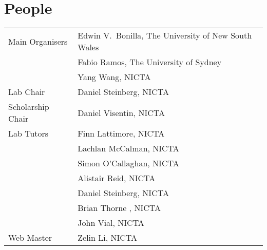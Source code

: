 {}
\section*{People}


\begin{tabular}{p{4.5cm}p{10cm}}
Main Organisers 
& Edwin V.~Bonilla, The University of New South Wales \\ [2mm]
& Fabio Ramos, The University of Sydney \\ [2mm]
& Yang Wang, NICTA  \\ [2mm]
Lab Chair
&
Daniel Steinberg, NICTA \\ [3mm]
Scholarship Chair
& 
Daniel Visentin, NICTA \\ [3mm]
Lab Tutors
&
Finn Lattimore,  NICTA \\ [2mm]
&  Lachlan McCalman, NICTA \\ [2mm]
& Simon O'Callaghan, NICTA \\ [2mm]
& Alistair Reid,  NICTA \\ [2mm]
& Daniel Steinberg, NICTA \\ [2mm]
& Brian Thorne , NICTA \\ [2mm]
& John Vial, NICTA  \\ [3mm]
Web Master 
&
Zelin Li, NICTA
\end{tabular}





